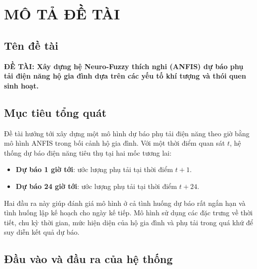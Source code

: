 \chapter*{MÔ TẢ ĐỀ TÀI}

\section{Tên đề tài}

\textbf{ĐỀ TÀI: Xây dựng hệ Neuro-Fuzzy thích nghi (ANFIS) dự báo phụ tải điện năng hộ gia đình dựa trên các yếu tố khí tượng và thói quen sinh hoạt.}

\section{Mục tiêu tổng quát}

Đề tài hướng tới xây dựng một mô hình dự báo phụ tải điện năng theo giờ bằng mô hình ANFIS trong bối cảnh hộ gia đình. Với một thời điểm quan sát $t$, hệ thống dự báo điện năng tiêu thụ tại hai mốc tương lai:

\begin{itemize}[leftmargin=1.2cm]
  \item \textbf{Dự báo 1 giờ tới}: ước lượng phụ tải tại thời điểm $t+1$.
  \item \textbf{Dự báo 24 giờ tới}: ước lượng phụ tải tại thời điểm $t+24$.
\end{itemize}

Hai đầu ra này giúp đánh giá mô hình ở cả tình huống dự báo rất ngắn hạn và tình huống lập kế hoạch cho ngày kế tiếp. Mô hình sử dụng các đặc trưng về thời tiết, chu kỳ thời gian, mức hiện diện của hộ gia đình và phụ tải trong quá khứ để suy diễn kết quả dự báo.

\section{Đầu vào và đầu ra của hệ thống}

